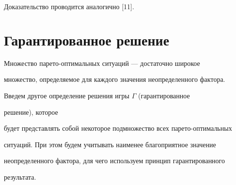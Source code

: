  


Доказательство проводится аналогично [11]. 


 


 


\section{Гарантированное решение} 


 


Множество парето-оптимальных ситуаций --- достаточно широкое 


множество, определяемое для каждого значения неопределенного фактора. 


Введем другое определение решения игры $\Gamma$ (гарантированное 


решение), которое 


будет представлять собой некоторое подмножество всех парето-оптимальных 


ситуаций. При этом будем учитывать наименее благоприятное значение 


неопределенного фактора, для чего используем принцип гарантированного 


результата. 


 


